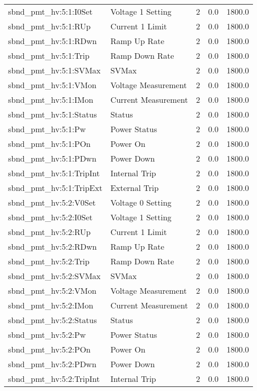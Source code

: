 \begin{center}
\begin{longtable}{l | l l l l }
sbnd\_pmt\_hv:5:1:I0Set & Voltage 1 Setting & 2 & 0.0 & 1800.0\\ 
sbnd\_pmt\_hv:5:1:RUp & Current 1 Limit & 2 & 0.0 & 1800.0\\ 
sbnd\_pmt\_hv:5:1:RDwn & Ramp Up Rate & 2 & 0.0 & 1800.0\\ 
sbnd\_pmt\_hv:5:1:Trip & Ramp Down Rate & 2 & 0.0 & 1800.0\\ 
sbnd\_pmt\_hv:5:1:SVMax & SVMax & 2 & 0.0 & 1800.0\\ 
sbnd\_pmt\_hv:5:1:VMon & Voltage Measurement & 2 & 0.0 & 1800.0\\ 
sbnd\_pmt\_hv:5:1:IMon & Current Measurement & 2 & 0.0 & 1800.0\\ 
sbnd\_pmt\_hv:5:1:Status & Status & 2 & 0.0 & 1800.0\\ 
sbnd\_pmt\_hv:5:1:Pw & Power Status & 2 & 0.0 & 1800.0\\ 
sbnd\_pmt\_hv:5:1:POn & Power On & 2 & 0.0 & 1800.0\\ 
sbnd\_pmt\_hv:5:1:PDwn & Power Down & 2 & 0.0 & 1800.0\\ 
sbnd\_pmt\_hv:5:1:TripInt & Internal Trip & 2 & 0.0 & 1800.0\\ 
sbnd\_pmt\_hv:5:1:TripExt & External Trip & 2 & 0.0 & 1800.0\\ 
sbnd\_pmt\_hv:5:2:V0Set & Voltage 0 Setting & 2 & 0.0 & 1800.0\\ 
sbnd\_pmt\_hv:5:2:I0Set & Voltage 1 Setting & 2 & 0.0 & 1800.0\\ 
sbnd\_pmt\_hv:5:2:RUp & Current 1 Limit & 2 & 0.0 & 1800.0\\ 
sbnd\_pmt\_hv:5:2:RDwn & Ramp Up Rate & 2 & 0.0 & 1800.0\\ 
sbnd\_pmt\_hv:5:2:Trip & Ramp Down Rate & 2 & 0.0 & 1800.0\\ 
sbnd\_pmt\_hv:5:2:SVMax & SVMax & 2 & 0.0 & 1800.0\\ 
sbnd\_pmt\_hv:5:2:VMon & Voltage Measurement & 2 & 0.0 & 1800.0\\ 
sbnd\_pmt\_hv:5:2:IMon & Current Measurement & 2 & 0.0 & 1800.0\\ 
sbnd\_pmt\_hv:5:2:Status & Status & 2 & 0.0 & 1800.0\\ 
sbnd\_pmt\_hv:5:2:Pw & Power Status & 2 & 0.0 & 1800.0\\ 
sbnd\_pmt\_hv:5:2:POn & Power On & 2 & 0.0 & 1800.0\\ 
sbnd\_pmt\_hv:5:2:PDwn & Power Down & 2 & 0.0 & 1800.0\\ 
sbnd\_pmt\_hv:5:2:TripInt & Internal Trip & 2 & 0.0 & 1800.0\\ 

\end{longtable}
\end{center}
